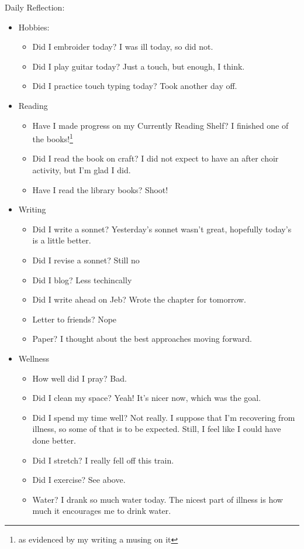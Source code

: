 \documentclass[12pt]{article}[titlepage]
\newcommand{\1}{\={a}}
\newcommand{\2}{\={e}}
\newcommand{\3}{\={\i}}
\newcommand{\4}{\=o}
\newcommand{\5}{\=u}
\newcommand{\6}{\={A}}
\renewcommand{\,}{\textsuperscript{,}}
\begin{document}
Daily Reflection:
\begin{itemize}
\item Hobbies:
\begin{itemize}
\item Did I embroider today? I was ill today, so did not.
\item Did I play guitar today? Just a touch, but enough, I think.
\item Did I practice touch typing today? Took another day off.
\end{itemize}
\item Reading
\begin{itemize}
\item Have I made progress on my Currently Reading Shelf? I finished one of the books!\footnote{as evidenced by my writing a musing on it}
\item Did I read the book on craft? I did not expect to have an after choir activity, but I'm glad I did.
\item Have I read the library books? Shoot!
\end{itemize}
\item Writing
\begin{itemize}
\item Did I write a sonnet? Yesterday's sonnet wasn't great, hopefully today's is a little better.
\item Did I revise a sonnet? Still no
\item Did I blog? Less techincally
\item Did I write ahead on Jeb? Wrote the chapter for tomorrow.
\item Letter to friends? Nope
\item Paper? I thought about the best approaches moving forward.
\end{itemize}
\item Wellness
\begin{itemize}
\item How well did I pray? Bad.
\item Did I clean my space? Yeah! It's nicer now, which was the goal.
\item Did I spend my time well? Not really. I suppose that I'm recovering from illness, so some of that is to be expected. Still, I feel like I could have done better.
\item Did I stretch? I really fell off this train.
\item Did I exercise? See above.
\item Water? I drank so much water today. The nicest part of illness is how much it encourages me to drink water.
\end{itemize}
\end{itemize}
\end{document}
